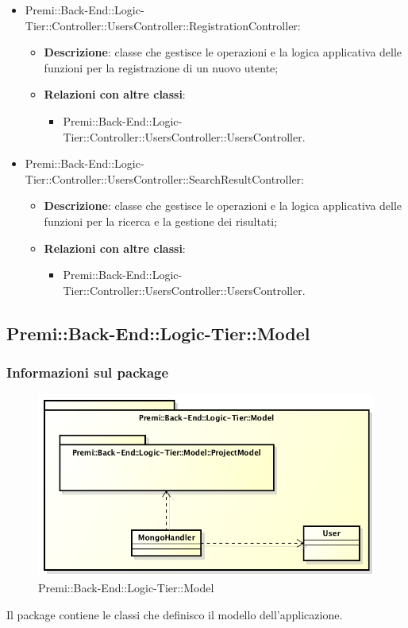 \begin{itemize}
			\item Premi::Back-End::Logic-Tier::Controller::UsersController::RegistrationController:
			\begin{itemize}
				\item \textbf{Descrizione}: classe che gestisce le operazioni e la logica applicativa delle funzioni per la registrazione di un nuovo utente;
				\item \textbf{Relazioni con altre classi}:
				\begin{itemize}
					\item Premi::Back-End::Logic-Tier::Controller::UsersController::UsersController.
				\end{itemize}
			\end{itemize}
			
			\item Premi::Back-End::Logic-Tier::Controller::UsersController::SearchResultController:
			\begin{itemize}
				\item \textbf{Descrizione}: classe che gestisce le operazioni e la logica applicativa delle funzioni per la ricerca e la gestione dei risultati;
				\item \textbf{Relazioni con altre classi}:
				\begin{itemize}
					\item Premi::Back-End::Logic-Tier::Controller::UsersController::UsersController.
				\end{itemize}
			\end{itemize}
		\end{itemize}


\subsection{Premi::Back-End::Logic-Tier::Model}
	\subsubsection*{Informazioni sul package}
		\begin{figure}[h]
			\centering
			\includegraphics[width=0.9\linewidth]{img/back-end_logic-tier_model}
			\caption[Premi::Back-End::Logic-Tier::Model]{Premi::Back-End::Logic-Tier::Model}
		\end{figure}
		Il package contiene le classi che definisco il modello dell'applicazione.
	
